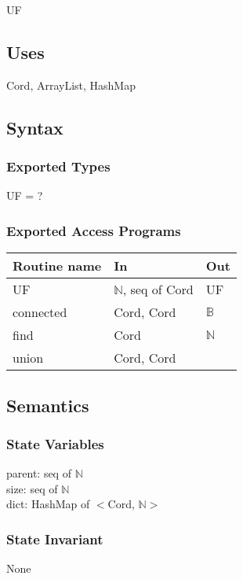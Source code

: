 \documentclass[12pt]{article}
\begin{document}
UF

\subsection* {Uses}

Cord, ArrayList, HashMap

\subsection* {Syntax}

\subsubsection* {Exported Types}

UF = ?

\subsubsection* {Exported Access Programs}

\begin{tabular}{| l | l | l |}
\hline
\textbf{Routine name} & \textbf{In} & \textbf{Out}\\
\hline
UF & $\mathbb{N}$, seq of Cord & UF\\
\hline
connected & Cord, Cord & $\mathbb{B}$\\
\hline
find & Cord & $\mathbb{N}$\\
\hline
union & Cord, Cord & ~ \\
\hline
\end{tabular}

\subsection* {Semantics}

\subsubsection* {State Variables}

parent: seq of $\mathbb{N}$\\
size: seq of $\mathbb{N}$\\
dict: HashMap of $<$Cord, $\mathbb{N}>$

\subsubsection* {State Invariant}

None
\end{document}
